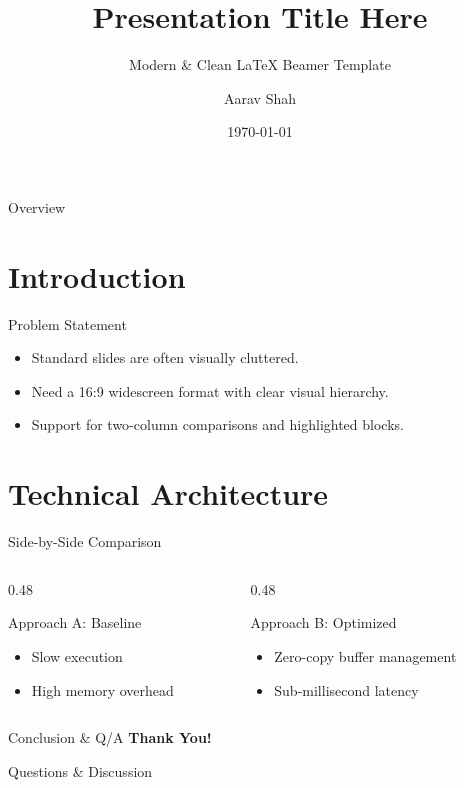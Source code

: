 \documentclass[10pt, aspectratio=169]{beamer}
\title{Presentation Title Here}
\subtitle{Modern & Clean LaTeX Beamer Template}
\author{Aarav Shah}
\institute{Department of Computer Science}
\date{\today}
\begin{document}
\begin{frame}
  \titlepage
\end{frame}

\begin{frame}{Overview}
  \tableofcontents
\end{frame}

\section{Introduction}

\begin{frame}{Problem Statement}
  \begin{itemize}
    \item Standard slides are often visually cluttered.
    \item Need a 16:9 widescreen format with clear visual hierarchy.
    \item Support for two-column comparisons and highlighted blocks.
  \end{itemize}
\end{frame}

\section{Technical Architecture}

\begin{frame}{Side-by-Side Comparison}
  \begin{columns}[T]
    \begin{column}{0.48\textwidth}
      \begin{block}{Approach A: Baseline}
        \begin{itemize}
          \item Slow execution
          \item High memory overhead
        \end{itemize}
      \end{block}
    \end{column}
    
    \begin{column}{0.48\textwidth}
      \begin{alertblock}{Approach B: Optimized}
        \begin{itemize}
          \item Zero-copy buffer management
          \item Sub-millisecond latency
        \end{itemize}
      \end{alertblock}
    \end{column}
  \end{columns}
\end{frame}

\begin{frame}{Conclusion \& Q/A}
  \centering
  \Huge \textcolor{primaryBlue}{\textbf{Thank You!}}
  
  \vspace{1em}
  \Large Questions \& Discussion
\end{frame}
\end{document}
